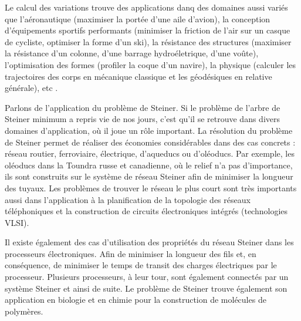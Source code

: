 \documentclass[10pt,a4paper]{article}%
\theoremstyle{theorem}
\theoremstyle{definition}
\begin{document}
	Le calcul des variations trouve des applications danq des domaines aussi variés que l'aéronautique (maximiser la portée d'une aile d'avion), la conception d'équipements sportifs performants (minimiser la friction de l'air sur un casque de cycliste, optimiser la forme d'un ski), la résistance des structures (maximiser la résistance d'un colonne, d'une barrage hydroéletrique, d'une voûte), l'optimisation des formes (profiler la coque d'un navire), la physique (calculer les trajectoires des corps en mécanique classique et les géodésiques en relative générale), etc \cite{Weinstock52}.
	
	
	Parlons de l'application du problème de Steiner. Si le problème de l’arbre de Steiner minimum a repris vie de nos	jours, c’est qu’il se retrouve dans divers domaines d’application, où il
	joue un rôle important. La résolution du problème de Steiner permet de réaliser des économies considérables dans des cas concrets : réseau routier, ferroviaire, électrique, d’aqueducs	ou d’oléoducs. Par exemple, les oléoducs dans la Toundra russe et canadienne, où le relief n'a pas d'importance, ils sont construits sur le système de réseau Steiner afin de minimiser la longueur des tuyaux. Les problèmes de trouver le réseau le plus court sont très importants aussi dans l'application à la planification de la topologie des réseaux téléphoniques et la construction de circuits électroniques intégrés (technologies VLSI).
	
	Il existe également des cas d'utilisation des propriétés du réseau Steiner dans les processeurs électroniques. Afin de minimiser la longueur des fils et, en conséquence, de minimiser le temps de transit des charges électriques par le processeur. Plusieurs processeurs, à leur tour, sont également connectés par un système Steiner et ainsi de suite. Le problème de Steiner trouve également son application en biologie et en chimie pour la construction de molécules de polymères.
	
\end{document}

